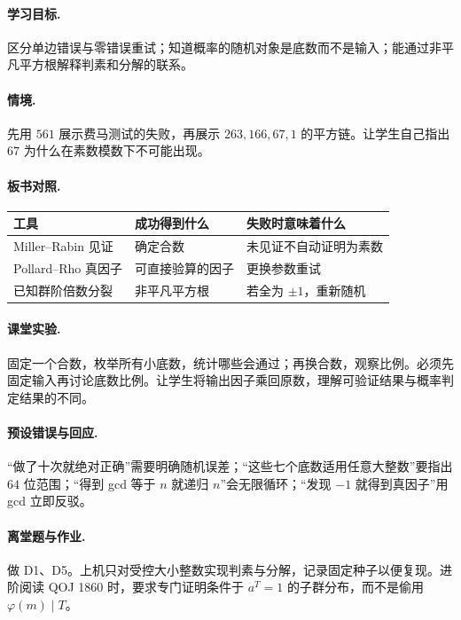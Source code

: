 \documentclass[UTF8,a4paper,11pt,oneside,openany,fontset=fandol]{ctexbook}
\theoremstyle{definition}
\begin{document}
\paragraph{学习目标.} 区分单边错误与零错误重试；知道概率的随机对象是底数而不是输入；能通过非平凡平方根解释判素和分解的联系。
\paragraph{情境.} 先用 $561$ 展示费马测试的失败，再展示 $263,166,67,1$ 的平方链。让学生自己指出 $67$ 为什么在素数模数下不可能出现。
\paragraph{板书对照.}
\begin{center}
\begin{tabular}{lll}
\toprule
工具 & 成功得到什么 & 失败时意味着什么\\\midrule
Miller--Rabin 见证 & 确定合数 & 未见证不自动证明为素数\\
Pollard--Rho 真因子 & 可直接验算的因子 & 更换参数重试\\
已知群阶倍数分裂 & 非平凡平方根 & 若全为 $\pm1$，重新随机\\\bottomrule
\end{tabular}
\end{center}
\paragraph{课堂实验.} 固定一个合数，枚举所有小底数，统计哪些会通过；再换合数，观察比例。必须先固定输入再讨论底数比例。让学生将输出因子乘回原数，理解可验证结果与概率判定结果的不同。
\paragraph{预设错误与回应.} “做了十次就绝对正确”需要明确随机误差；“这些七个底数适用任意大整数”要指出 $64$ 位范围；“得到 gcd 等于 $n$ 就递归 $n$”会无限循环；“发现 $-1$ 就得到真因子”用 gcd 立即反驳。
\paragraph{离堂题与作业.} 做 D1、D5。上机只对受控大小整数实现判素与分解，记录固定种子以便复现。进阶阅读 QOJ 1860 时，要求专门证明条件于 $a^T=1$ 的子群分布，而不是偷用 $\varphi(m)\mid T$。
\end{document}
